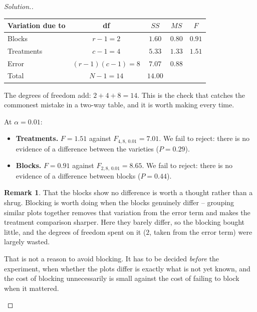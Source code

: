 \documentclass[11pt,a4paper]{article}
\theoremstyle{definition}
\newtheorem{remark}[thm]{Remark}
\newenvironment{solution}
  {\renewcommand{\qedsymbol}{}\begin{proof}[\textit{Solution}.]}
  {\end{proof}}
\begin{document}
\begin{solution}
\begin{table}[H]
\centering
\begin{tabular}{lcccc}
Variation due to & df & $SS$ & $MS$ & $F$\\
\hline
Blocks      & $r-1=2$        & $1.60$  & $0.80$ & $0.91$\\
Treatments  & $c-1=4$        & $5.33$  & $1.33$ & $1.51$\\
Error       & $(r-1)(c-1)=8$ & $7.07$  & $0.88$ & \\
\hline
Total       & $N-1=14$       & $14.00$ & & \\
\end{tabular}
\end{table}
The degrees of freedom add: $2+4+8=14$. This is the check that catches the commonest
mistake in a two-way table, and it is worth making every time.

At $\alpha=0.01$:
\begin{itemize}
\item \textbf{Treatments.} $F=1.51$ against $F_{4,8,\,0.01}=7.01$. We fail to reject:
there is no evidence of a difference between the varieties ($P=0.29$).
\item \textbf{Blocks.} $F=0.91$ against $F_{2,8,\,0.01}=8.65$. We fail to reject: there is
no evidence of a difference between blocks ($P=0.44$).
\end{itemize}

\begin{remark}
That the blocks show no difference is worth a thought rather than a shrug. Blocking is
worth doing when the blocks genuinely differ -- grouping similar plots together removes
that variation from the error term and makes the treatment comparison sharper. Here they
barely differ, so the blocking bought little, and the degrees of freedom spent on it
($2$, taken from the error term) were largely wasted.

That is not a reason to avoid blocking. It has to be decided \emph{before} the experiment,
when whether the plots differ is exactly what is not yet known, and the cost of blocking
unnecessarily is small against the cost of failing to block when it mattered.
\end{remark}
\end{solution}









\vspace{1cm}
\end{document}
